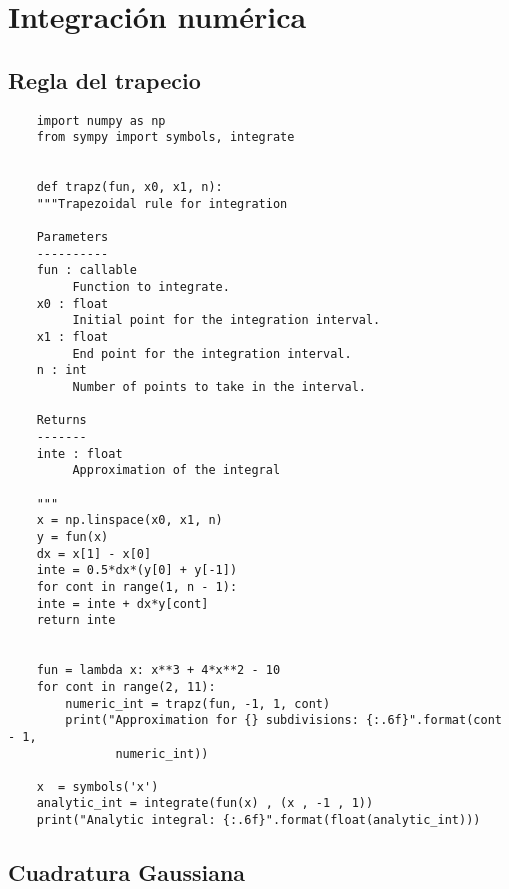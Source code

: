 \section{Integración numérica}

\subsection{Regla del trapecio}

\begin{verbatim}
    import numpy as np
    from sympy import symbols, integrate


    def trapz(fun, x0, x1, n):
    """Trapezoidal rule for integration
    
    Parameters
    ----------
    fun : callable
         Function to integrate.
    x0 : float
         Initial point for the integration interval.
    x1 : float
         End point for the integration interval.
    n : int
         Number of points to take in the interval.
    
    Returns
    -------
    inte : float
         Approximation of the integral
    
    """
    x = np.linspace(x0, x1, n)
    y = fun(x)
    dx = x[1] - x[0]
    inte = 0.5*dx*(y[0] + y[-1])
    for cont in range(1, n - 1):
    inte = inte + dx*y[cont]
    return inte


    fun = lambda x: x**3 + 4*x**2 - 10
    for cont in range(2, 11):
        numeric_int = trapz(fun, -1, 1, cont)
        print("Approximation for {} subdivisions: {:.6f}".format(cont - 1,
               numeric_int))

    x  = symbols('x')
    analytic_int = integrate(fun(x) , (x , -1 , 1))
    print("Analytic integral: {:.6f}".format(float(analytic_int)))
\end{verbatim}

\subsection{Cuadratura Gaussiana}

